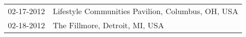 \begin{supertabular}{ll}
 02-17-2012 &  Lifestyle Communities Pavilion, Columbus, OH, USA \\
 02-18-2012 &                     The Fillmore, Detroit, MI, USA \\
\end{supertabular}
